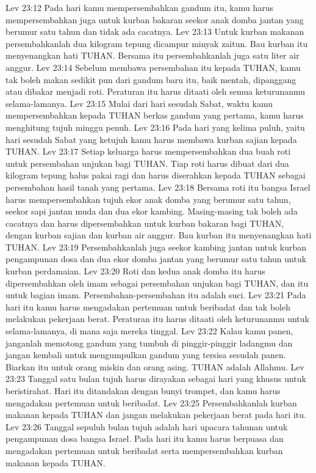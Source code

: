 Lev 23:12  Pada hari kamu mempersembahkan gandum itu, kamu harus mempersembahkan juga untuk kurban bakaran seekor anak domba jantan yang berumur satu tahun dan tidak ada cacatnya.
Lev 23:13  Untuk kurban makanan persembahkanlah dua kilogram tepung dicampur minyak zaitun. Bau kurban itu menyenangkan hati TUHAN. Bersama itu persembahkanlah juga satu liter air anggur.
Lev 23:14  Sebelum membawa persembahan itu kepada TUHAN, kamu tak boleh makan sedikit pun dari gandum baru itu, baik mentah, dipanggang atau dibakar menjadi roti. Peraturan itu harus ditaati oleh semua keturunanmu selama-lamanya.
Lev 23:15  Mulai dari hari sesudah Sabat, waktu kamu mempersembahkan kepada TUHAN berkas gandum yang pertama, kamu harus menghitung tujuh minggu penuh.
Lev 23:16  Pada hari yang kelima puluh, yaitu hari sesudah Sabat yang ketujuh kamu harus membawa kurban sajian kepada TUHAN.
Lev 23:17  Setiap keluarga harus mempersembahkan dua buah roti untuk persembahan unjukan bagi TUHAN. Tiap roti harus dibuat dari dua kilogram tepung halus pakai ragi dan harus diserahkan kepada TUHAN sebagai persembahan hasil tanah yang pertama.
Lev 23:18  Bersama roti itu bangsa Israel harus mempersembahkan tujuh ekor anak domba yang berumur satu tahun, seekor sapi jantan muda dan dua ekor kambing. Masing-masing tak boleh ada cacatnya dan harus dipersembahkan untuk kurban bakaran bagi TUHAN, dengan kurban sajian dan kurban air anggur. Bau kurban itu menyenangkan hati TUHAN.
Lev 23:19  Persembahkanlah juga seekor kambing jantan untuk kurban pengampunan dosa dan dua ekor domba jantan yang berumur satu tahun untuk kurban perdamaian.
Lev 23:20  Roti dan kedua anak domba itu harus dipersembahkan oleh imam sebagai persembahan unjukan bagi TUHAN, dan itu untuk bagian imam. Persembahan-persembahan itu adalah suci.
Lev 23:21  Pada hari itu kamu harus mengadakan pertemuan untuk beribadat dan tak boleh melakukan pekerjaan berat. Peraturan itu harus ditaati oleh keturunanmu untuk selama-lamanya, di mana saja mereka tinggal.
Lev 23:22  Kalau kamu panen, janganlah memotong gandum yang tumbuh di pinggir-pinggir ladangmu dan jangan kembali untuk mengumpulkan gandum yang tersisa sesudah panen. Biarkan itu untuk orang miskin dan orang asing. TUHAN adalah Allahmu.
Lev 23:23  Tanggal satu bulan tujuh harus dirayakan sebagai hari yang khusus untuk beristirahat. Hari itu ditandakan dengan bunyi trompet, dan kamu harus mengadakan pertemuan untuk beribadat.
Lev 23:25  Persembahkanlah kurban makanan kepada TUHAN dan jangan melakukan pekerjaan berat pada hari itu.
Lev 23:26  Tanggal sepuluh bulan tujuh adalah hari upacara tahunan untuk pengampunan dosa bangsa Israel. Pada hari itu kamu harus berpuasa dan mengadakan pertemuan untuk beribadat serta mempersembahkan kurban makanan kepada TUHAN.
